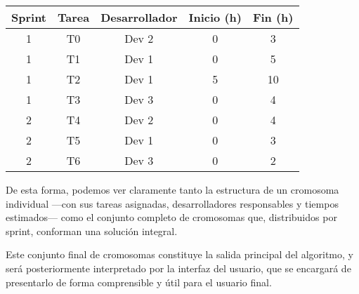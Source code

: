 \begin{center}
    \begin{tabular}{|c|c|c|c|c|}
        \hline
        \textbf{Sprint} & \textbf{Tarea} & \textbf{Desarrollador} & \textbf{Inicio (h)} & \textbf{Fin (h)} \\
        \hline
        1               & T0             & Dev 2                  & 0                   & 3                \\
        1               & T1             & Dev 1                  & 0                   & 5                \\
        1               & T2             & Dev 1                  & 5                   & 10               \\
        1               & T3             & Dev 3                  & 0                   & 4                \\
        \hline
        2               & T4             & Dev 2                  & 0                   & 4                \\
        2               & T5             & Dev 1                  & 0                   & 3                \\
        2               & T6             & Dev 3                  & 0                   & 2                \\
        \hline
    \end{tabular}
\end{center}

De esta forma, podemos ver claramente tanto la estructura de un cromosoma individual —con sus tareas asignadas, desarrolladores responsables y tiempos estimados— como el conjunto completo de cromosomas que, distribuidos por sprint, conforman una solución integral.

Este conjunto final de cromosomas constituye la salida principal del algoritmo, y será posteriormente interpretado por la interfaz del usuario, que se encargará de presentarlo de forma comprensible y útil para el usuario final.





